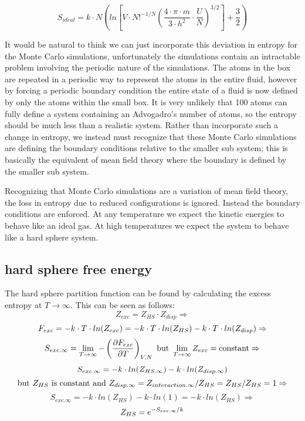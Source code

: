 $$S_{ideal}=k\cdot N \left ( ln\left [ V\cdot N!^{-1/N}\left ( \frac{4\cdot \pi\cdot m}{3\cdot h^2}\cdot\frac{U}{N} \right)^{3/2}  \right]+\frac{3}{2}\right )$$

It would be natural to think we can just incorporate this deviation in entropy for the Monte Carlo simulations, unfortunately the simulations contain an intractable problem involving the periodic nature of the simulations. The atoms in the box are repeated in a periodic way to represent the atoms in the entire fluid, however by forcing a periodic boundary condition the entire state of a fluid is now defined by only the atoms within the small box. It is very unlikely that 100 atoms can fully define a system containing an Advogadro's number of atoms, so the entropy should be much less than a realistic system. Rather than incorporate such a change in entropy, we instead must recognize that these Monte Carlo simulations are defining the boundary conditions relative to the smaller sub system; this is basically the equivalent of mean field theory where the boundary is defined by the smaller sub system. 

Recognizing that Monte Carlo simulations are a variation of mean field theory, the loss in entropy due to reduced configurations is ignored. Instead the boundary conditions are enforced. At any temperature we expect the kinetic energies to behave like an ideal gas. At high temperatures we expect the system to behave like a hard sphere system.

\subsection{hard sphere free energy}
The hard sphere partition function can be found by calculating the excess entropy at $T\to\infty$. This can be seen as follows:
$$Z_{exc}=Z_{HS}\cdot Z_{disp}\Rightarrow$$
$$\newline F_{exc}=-k\cdot T\cdot ln(Z_{exc})=-k\cdot T\cdot ln(Z_{HS})-k\cdot T\cdot ln(Z_{disp})\Rightarrow $$
$$\newline S_{exc.\infty}=\lim_{T\to\infty}-\left ( \frac{\partial F_{exc}}{\partial T} \right ) _{V,N} \text{ but }\lim_{T\to\infty}Z_{exc}=\text{constant}\Rightarrow$$
$$\newline S_{exc.\infty}=-k\cdot ln(Z_{HS.\infty})-k\cdot ln(Z_{disp.\infty})$$
$$\newline \text{but }Z_{HS}\text{ is constant and }Z_{disp.\infty}=Z_{interaction.\infty}/Z_{HS}=Z_{HS}/Z_{HS}=1 \Rightarrow$$
$$S_{exc.\infty}=-k\cdot ln(Z_{HS})-k\cdot ln(1)=-k\cdot ln(Z_{HS}) \Rightarrow$$
$$\newline Z_{HS}=e^{-S_{exc.\infty}/k}$$

